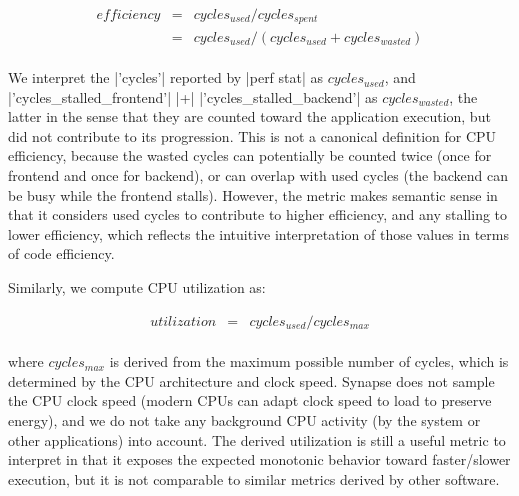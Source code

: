 \documentclass[10pt, conference, compsocconf]{IEEEtran}
\newcommand{\synapse}{Synapse\xspace}
\begin{document}
 \begin{eqnarray*} \mathit{efficiency} &=& cycles_{used} /
     cycles_{spent}\\ &=& cycles_{used} / (cycles_{used} +
     cycles_{wasted}) \end{eqnarray*}\\[-1em]

 \noindent
 We interpret the |'cycles'| reported by |perf stat| as
 $cycles_{used}$, and |'cycles_stalled_frontend'| |+|
 |'cycles_stalled_backend'| as $cycles_{wasted}$, the latter in the
 sense that they are counted toward the application execution, but did
 not contribute to its progression.  This is not a canonical
 definition for CPU efficiency, because the wasted cycles can
 potentially be counted twice (once for frontend and once for
 backend), or can overlap with used cycles (the backend can be busy
 while the frontend stalls).  However, the metric makes semantic sense
 in that it considers used cycles to contribute to higher efficiency,
 and any stalling to lower efficiency, which reflects the intuitive
 interpretation of those values in terms of code efficiency.

 Similarly, we compute CPU utilization as:

 \begin{eqnarray*}
     utilization &=& cycles_{used} / cycles_{max}
 \end{eqnarray*}\\[-1em]

 \noindent
 where $cycles_{max}$ is derived from the maximum possible number of
 cycles, which is determined by the CPU architecture and clock speed.
 \synapse does not sample the CPU clock speed (modern CPUs can adapt
 clock speed to load to preserve energy), and we do not take any
 background CPU activity (by the system or other applications) into
 account.  The derived utilization is still a useful metric to
 interpret in that it exposes the expected monotonic behavior toward
 faster/slower execution, but it is not comparable to similar metrics
 derived by other software.
\end{document}

